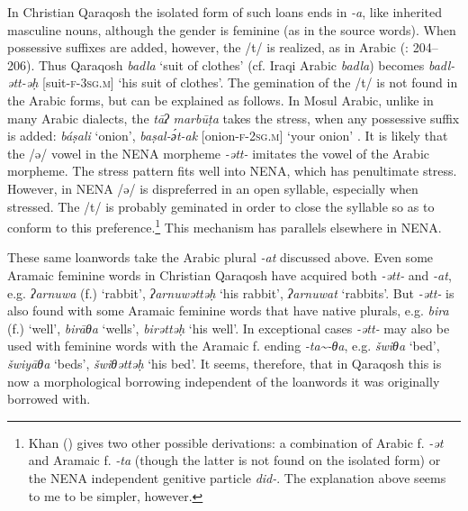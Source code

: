 \documentclass[output=paper]{langsci/langscibook}
\begin{document}
In Christian Qaraqosh the isolated form of such loans ends in \textit{{}-a}, like inherited masculine nouns, although the gender is feminine (as in the source words). When possessive suffixes are added, however, the /t/ is realized, as in Arabic (\citealt{Khan2002}: 204–206). Thus Qaraqosh \textit{badla} ‘suit of clothes’ (cf. Iraqi Arabic \textit{badla}) becomes \textit{badl\nobreakdash-ətt\nobreakdash-əḥ} [suit-\textsc{f-3sg.m]} ‘his suit of clothes’. The gemination of the /t/ is not found in the Arabic forms, but can be explained as follows. In Mosul Arabic, unlike in many Arabic dialects, the \textit{tāʔ} \textit{marbūṭa} takes the stress, when any possessive suffix is added: \textit{báṣali} ‘onion’, \textit{baṣal\nobreakdash-ә́t\nobreakdash-ak} [onion-\textsc{f-2sg.m}] ‘your onion’ \citep[105]{Jastrow1983}. It is likely that the /ə/ vowel in the NENA morpheme \textit{{}-ətt-} imitates the vowel of the Arabic morpheme. The stress pattern fits well into NENA, which has penultimate stress. However, in NENA /ə/ is dispreferred in an open syllable, especially when stressed. The /t/ is probably geminated in order to close the syllable so as to conform to this preference.\footnote{Khan (\citeyear[206]{Khan2002}) gives two other possible derivations: a combination of Arabic f. \textit{\nobreakdash-ət} and Aramaic f. \textit{\nobreakdash-ta} (though the latter is not found on the isolated form) or the NENA independent genitive particle \textit{did-}. The explanation above seems to me to be simpler, however.} This mechanism has parallels elsewhere in NENA.

These same loanwords take the Arabic plural \textit{{}-at} discussed above. Even some Aramaic feminine words in Christian Qaraqosh have acquired both \textit{{}-ətt-} and \textit{\nobreakdash-at}, e.g. \textit{ʔarnuwa} (f.) ‘rabbit’, \textit{ʔarnuwəttəḥ} ‘his rabbit’, \textit{ʔarnuwat} ‘rabbits’. But \textit{{}-ətt-} is also found with some Aramaic feminine words that have native plurals, e.g. \textit{bira} (f.) ‘well’, \textit{birāθa} ‘wells’, \textit{birəttəḥ} ‘his well’. In exceptional cases \textit{{}-ətt-} may also be used with feminine words with the Aramaic f. ending \textit{{}-ta{\textasciitilde}-θa}, e.g. \textit{šwiθa} ‘bed’, \textit{šwiyāθa} ‘beds’, \textit{šwiθəttəḥ} ‘his bed’. It seems, therefore, that in Qaraqosh this is now a morphological borrowing independent of the loanwords it was originally borrowed with.
\end{document}

